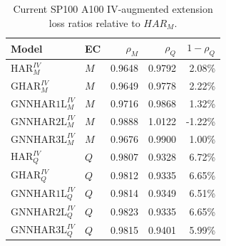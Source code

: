 \begin{table}[H]
\centering
\small
\begin{tabular}{llrrr}
\toprule
Model & EC & \(\rho_M\) & \(\rho_Q\) & \(1-\rho_Q\) \\
\midrule
\(\mathrm{HAR}_{M}^{IV}\) & \(M\) & 0.9648 & 0.9792 & 2.08\% \\
\(\mathrm{GHAR}_{M}^{IV}\) & \(M\) & 0.9649 & 0.9778 & 2.22\% \\
\(\mathrm{GNNHAR1L}_{M}^{IV}\) & \(M\) & 0.9716 & 0.9868 & 1.32\% \\
\(\mathrm{GNNHAR2L}_{M}^{IV}\) & \(M\) & 0.9888 & 1.0122 & -1.22\% \\
\(\mathrm{GNNHAR3L}_{M}^{IV}\) & \(M\) & 0.9676 & 0.9900 & 1.00\% \\
\(\mathrm{HAR}_{Q}^{IV}\) & \(Q\) & 0.9807 & 0.9328 & 6.72\% \\
\(\mathrm{GHAR}_{Q}^{IV}\) & \(Q\) & 0.9812 & 0.9335 & 6.65\% \\
\(\mathrm{GNNHAR1L}_{Q}^{IV}\) & \(Q\) & 0.9814 & 0.9349 & 6.51\% \\
\(\mathrm{GNNHAR2L}_{Q}^{IV}\) & \(Q\) & 0.9823 & 0.9335 & 6.65\% \\
\(\mathrm{GNNHAR3L}_{Q}^{IV}\) & \(Q\) & 0.9815 & 0.9401 & 5.99\% \\
\bottomrule
\end{tabular}
\caption{Current SP100 A100 IV-augmented extension loss ratios relative to \(HAR_M\).}
\label{tab:sp100-a100-iv-loss}
\end{table}
